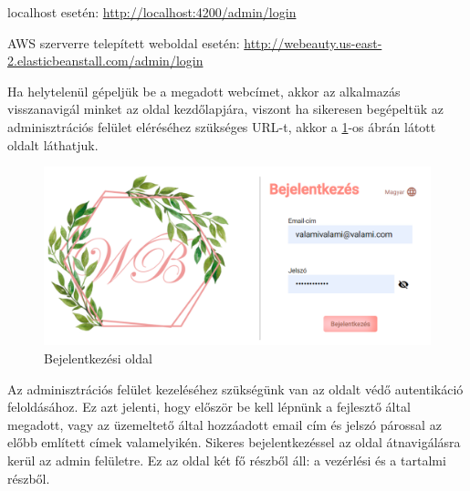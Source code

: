 \begin{compactitem}
	\item localhost esetén: \url{http://localhost:4200/admin/login}
	\item AWS szerverre telepített weboldal esetén: \url{http://webeauty.us-east-2.elasticbeanstall.com/admin/login}
\end{compactitem}

Ha helytelenül gépeljük be a megadott webcímet, akkor az alkalmazás visszanavigál minket az oldal kezdőlapjára, viszont ha sikeresen begépeltük az adminisztrációs felület eléréséhez szükséges URL-t, akkor a \ref{fig.exemple-6}-os ábrán látott oldalt láthatjuk.
\begin{figure}[H]
	\centering
	\includegraphics[width=1.0\textwidth]{images/bejelentkezes.png}
	\caption{Bejelentkezési oldal}
	\label{fig.exemple-6}
\end{figure}
Az adminisztrációs felület kezeléséhez szükségünk van az oldalt védő autentikáció feloldásához. Ez azt jelenti, hogy először be kell lépnünk a fejlesztő által megadott, vagy az üzemeltető által hozzáadott email cím és jelszó párossal az előbb említett címek valamelyikén. Sikeres bejelentkezéssel az oldal átnavigálásra kerül az admin felületre. Ez az oldal két fő részből áll: a vezérlési és a tartalmi részből.
